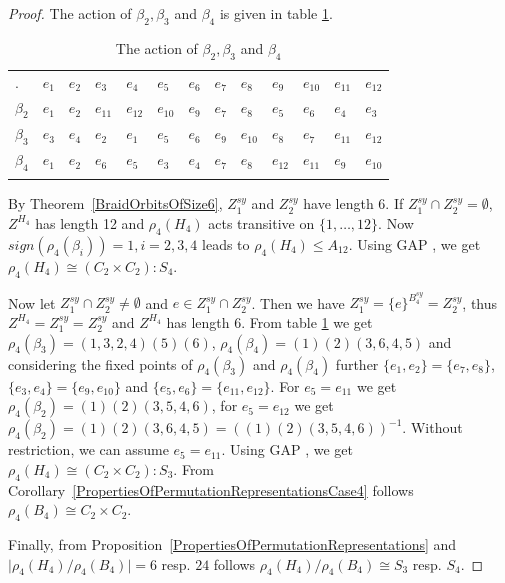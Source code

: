 \documentclass[12pt,a4paper]{article}
\numberwithin{equation}{section}
\numberwithin{table}{section}
\begin{document}
\begin{proof}
The action of $\beta_2, \beta_3$ and $\beta_4$ is given in table \ref{tab:ActionBeta2Beta3Beta4}.
%
\begin{table}[!htbp]
\centering
\footnotesize
\captionsetup{font=footnotesize}
\caption{The action of $\beta_2, \beta_3$ and $\beta_4$}
\label{tab:ActionBeta2Beta3Beta4}
\begin{tabular}{lllllllllllll}
\hline\noalign{\smallskip}
.              & $e_1$ & $e_2$ & $e_3$ & $e_4$ & $e_5$ & $e_6$ & $e_7$ & $e_8$ & $e_9$ & $e_{10}$ & $e_{11}$ & $e_{12}$ \\
\noalign{\smallskip}\hline\noalign{\smallskip}
$\beta_2$ & $e_1$ & $e_2$ & $e_{11}$ & $e_{12}$ & $e_{10}$ & $e_9$ & $e_7$ & $e_8$  & $e_5$  & $e_6$  & $e_4$  & $e_3$ \\
$\beta_3$ & $e_3$ & $e_4$ & $e_2$  & $e_1$  & $e_5$ &  $e_6$ & $e_9$ & $e_{10}$ & $e_8$  & $e_7$  & $e_{11}$ & $e_{12}$ \\
$\beta_4$ & $e_1$ & $e_2$ & $e_6$  & $e_5$  & $e_3$ &  $e_4$ & $e_7$ & $e_8$  & $e_{12}$ & $e_{11}$ & $e_9$  & $e_{10}$ \\
\noalign{\smallskip}\hline
\end{tabular}
\end{table}
%
By Theorem~\ref{BraidOrbitsOfSize6}, $Z^{sy}_1$ and $Z^{sy}_2$ have length 6. If $Z^{sy}_1 \cap Z^{sy}_2 = \emptyset$,
$Z^{H_4}$ has length 12 and $\rho_4(H_4)$ acts transitive on $\{ 1,\dots,12 \}$.
Now $sign(\rho_4(\beta_i)) = 1, i = 2,3,4$ leads to $\rho_4(H_4) \leq A_{12}$.
Using GAP \cite{RefGAP}, we get $\rho_4(H_4) \cong (C_2 \times C_2):S_4$.
\par
\noindent
Now let $Z^{sy}_1 \cap Z^{sy}_2 \neq \emptyset$ and $e \in Z^{sy}_1 \cap Z^{sy}_2$.
Then we have $Z^{sy}_1 = {\{ e \}}^{B^{sy}_4} = Z^{sy}_2$, thus $Z^{H_4} = Z^{sy}_1 = Z^{sy}_2$
and $Z^{H_4}$ has length 6.
From table \ref{tab:ActionBeta2Beta3Beta4} we get $\rho_4(\beta_3)=(1,3,2,4)(5)(6)$,
$\rho_4(\beta_4)=(1)(2)(3,6,4,5)$ and considering the fixed points of $\rho_4(\beta_3)$ and 
$\rho_4(\beta_4)$ further $\{ e_1,e_2 \}=\{ e_7,e_8 \}$,
$\{ e_3,e_4 \}=\{ e_9,e_{10} \}$ and $\{ e_5,e_6 \}=\{ e_{11},e_{12} \}$.
For $e_5=e_{11}$ we get $\rho_4(\beta_2)=(1)(2)(3,5,4,6)$, for $e_5=e_{12}$ we get
$\rho_4(\beta_2)=(1)(2)(3,6,4,5)= ((1)(2)(3,5,4,6))^{-1}$.
Without restriction, we can assume $e_5=e_{11}$.
Using GAP \cite{RefGAP}, we get $\rho_4(H_4) \cong (C_2 \times C_2):S_3$.
From Corollary~\ref{PropertiesOfPermutationRepresentationsCase4} follows $\rho_4(B_4) \cong C_2 \times C_2$.
\par
\noindent
Finally, from Proposition~\ref{PropertiesOfPermutationRepresentations} and
$\vert \rho_4(H_4)/\rho_4(B_4) \vert = 6$ resp. $24$ follows $\rho_4(H_4)/\rho_4(B_4) \cong S_3$ resp. $S_4$.
\end{proof}
\end{document}
